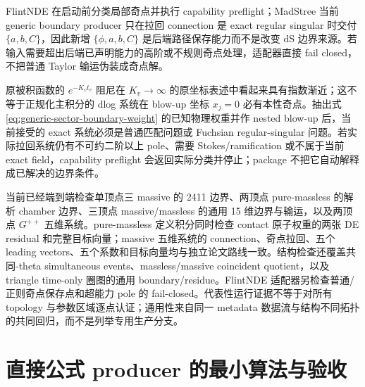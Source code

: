 \documentclass[11pt,a4paper]{ctexart}
\begin{document}
FlintNDE 在启动前分类局部奇点并执行 capability preflight；MadStree 当前 generic boundary producer 只在拉回 connection 是 exact regular singular 时交付 $\{a,b,C\}$，因此新增 $\{\phi,a,b,C\}$ 是后端路径保存能力而不是改变 dS 边界来源。若输入需要超出后端已声明能力的高阶或不规则奇点处理，适配器直接 fail closed，不把普通 Taylor 输运伪装成奇点解。

原被积函数的 $e^{-K_vt_v}$ 阻尼在 $K_v\to\infty$ 的原坐标表述中看起来具有指数渐近；这不等于正规化主积分的 dlog 系统在 blow-up 坐标 $x_j=0$ 必有本性奇点。抽出式 \eqref{eq:generic-sector-boundary-weight} 的已知物理权重并作 nested blow-up 后，当前接受的 exact 系统必须是普通匹配问题或 Fuchsian regular-singular 问题。若实际拉回系统仍有不可约二阶以上 pole、需要 Stokes/ramification 或不属于当前 exact field，capability preflight 会返回实际分类并停止；package 不把它自动解释成已解决的边界条件。

当前已经端到端检查单顶点三 massive 的 2411 边界、两顶点 pure-massless 的解析 chamber 边界、三顶点 massive/massless 的通用 15 维边界与输运，以及两顶点 $G^{++}$ 五维系统。pure-massless 定义积分同时检查 contact 原子权重的两张 DE residual 和完整目标向量；massive 五维系统的 connection、奇点拉回、五个 leading vectors、五个系数和目标向量均与独立论文路线一致。结构检查还覆盖共同-theta simultaneous events、massless/massive coincident quotient，以及 triangle time-only 圈图的通用 boundary/residue。FlintNDE 适配器另检查普通/正则奇点保存点和超能力 pole 的 fail-closed。代表性运行证据不等于对所有 topology 与参数区域逐点认证；通用性来自同一 metadata 数据流与结构不同拓扑的共同回归，而不是列举专用生产分支。

\section{直接公式 producer 的最小算法与验收}
\end{document}
